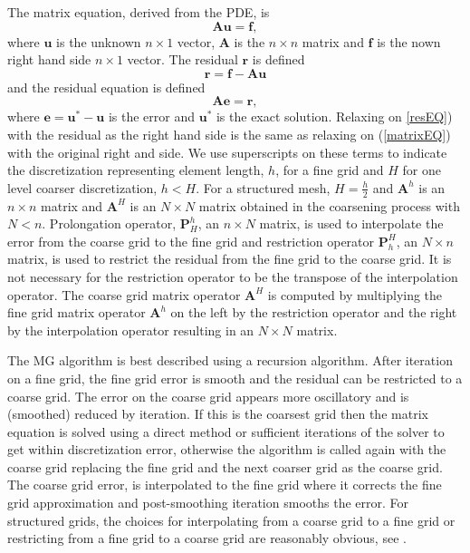 The matrix equation,  derived from the PDE, is
\begin{equation}\label{matrixEQ}
    \mathbf{A}\mathbf{u}=\mathbf{f},
\end{equation}
where $\mathbf{u}$ is the unknown $n\times 1$ vector, $\mathbf{A}$ is the $n\times n$ matrix and $\mathbf{f}$ is the nown right hand side $n\times 1$ vector.  The residual $\mathbf{r}$ is defined
\begin{equation}\label{res}
    \mathbf{r}=\mathbf{f}-\mathbf{A}\mathbf{u}%
\end{equation}
and the residual equation is defined 
\begin{equation}\label{resEQ}
    \mathbf{A}\mathbf{e}=\mathbf{r},
\end{equation}
where $\mathbf{e}=\mathbf{u}^*-\mathbf{u}$ is the error and $\mathbf{u}^*$ is the exact solution.  Relaxing on \ref{resEQ}) with the residual as the right hand side is the same as relaxing on (\ref{matrixEQ}) with the original right and side.  We use superscripts on these terms to indicate the discretization representing element length, $h$, for a fine grid and $H$ for one level coarser discretization, $h<H$.  For a structured mesh, $H=\frac{h}{2}$ and $\mathbf{A}^h$ is an $n\times n$ matrix and $\mathbf{A}^H$ is an $N\times N$ matrix obtained in the coarsening process with $N<n$.  Prolongation operator, $\mathbf{P}^h_H$, an $n\times N$ matrix, is used to interpolate the error from the coarse grid to the fine grid and restriction operator $\mathbf{P}_h^H$, an $N\times n$ matrix, is used to restrict the residual from the fine grid to the coarse grid.  It is not necessary for the restriction operator to be the transpose of the interpolation operator.  The coarse grid matrix operator $\mathbf{A}^H$ is computed by multiplying the fine grid matrix operator $\mathbf{A}^h$ on the left by the restriction operator and the right by the interpolation operator resulting in an $N\times N$ matrix.  

The MG algorithm is best described using a recursion algorithm.  After iteration on a fine grid, the fine grid error is smooth and the residual can be restricted to a coarse grid. The error on the coarse grid appears more oscillatory and is (smoothed) reduced by iteration.  If this is the coarsest grid then the matrix equation is solved using a direct method or sufficient iterations of the solver to get within discretization error, otherwise the algorithm is called again with the coarse grid replacing the fine grid and the next coarser grid as the coarse grid.  The coarse grid error, is interpolated to the fine grid where it corrects the fine grid approximation and post-smoothing iteration smooths the error.  For structured grids, the choices for interpolating from a coarse grid to a fine grid or restricting from a fine grid to a coarse grid are reasonably obvious, see \cite{Briggs2000}. 


